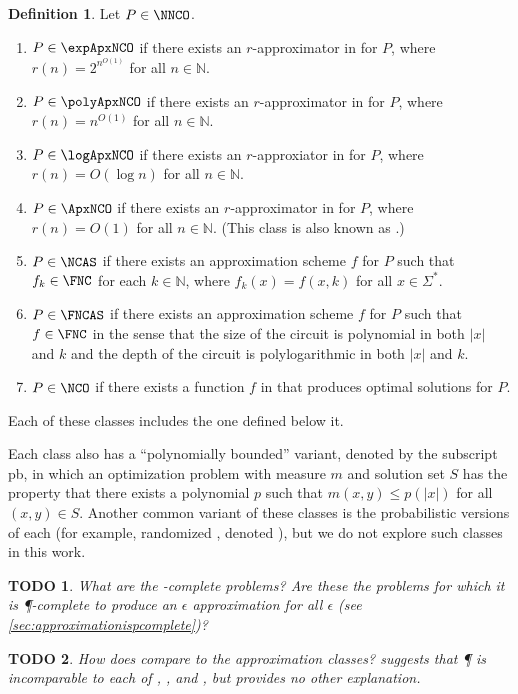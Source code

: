 \documentclass[]{article}
\theoremstyle{plain}
\newtheorem{todo}{TODO}
\theoremstyle{definition}
\newtheorem{definition}{Definition}
\newcommand{\pb}{\textsf{pb}}
\begin{document}
\begin{definition}\label{def:ncx}
  Let $P\in\NNCO$.
  \begin{enumerate}
  \item $P\in\expApxNCO$ if there exists an $r$-approximator in \FNC{} for $P$, where $r(n)=2^{n^{O(1)}}$ for all $n\in\mathbb{N}$.
  \item $P\in\polyApxNCO$ if there exists an $r$-approximator in \FNC{} for $P$, where $r(n)=n^{O(1)}$ for all $n\in\mathbb{N}$.
  \item $P\in\logApxNCO$ if there exists an $r$-approxiator in \FNC{} for $P$, where $r(n)=O(\log n)$ for all $n\in\mathbb{N}$.
  \item $P\in\ApxNCO$ if there exists an $r$-approximator in \FNC{} for $P$, where $r(n)=O(1)$ for all $n\in\mathbb{N}$.
    (This class is also known as \NCX.)
  \item $P\in\NCAS$ if there exists an approximation scheme $f$ for $P$ such that $f_k\in\FNC$ for each $k\in\mathbb{N}$, where $f_k(x)=f(x, k)$ for all $x\in\Sigma^*$.
  \item $P\in\FNCAS$ if there exists an approximation scheme $f$ for $P$ such that $f\in\FNC$ in the sense that the size of the circuit is polynomial in both $|x|$ and $k$ and the depth of the circuit is polylogarithmic in both $|x|$ and $k$.
  \item $P\in\NCO$ if there exists a function $f$ in \FNC{} that produces optimal solutions for $P$.
  \end{enumerate}
\end{definition}

Each of these classes includes the one defined below it.

Each class also has a ``polynomially bounded'' variant, denoted by the subscript \pb, in which an optimization problem with measure $m$ and solution set $S$ has the property that there exists a polynomial $p$ such that $m(x, y) \leq p(|x|)$ for all $(x, y)\in S$.
Another common variant of these classes is the probabilistic versions of each (for example, randomized \NCAS{}, denoted \RNCAS), but we do not explore such classes in this work.

\begin{todo}
  What are the \PO-complete problems?
  Are these the problems for which it is \P-complete to produce an $\epsilon$ approximation for all $\epsilon$ (see \autoref{sec:approximationispcomplete})?
\end{todo}

\begin{todo}
  How does \PO{} compare to the \NC{} approximation classes?
  \cite[Figure~2.2]{dsst97} suggests that \P{} is incomparable to each of \FNCAS, \NCAS, and \ApxNCO, but provides no other explanation.
\end{todo}
\end{document}
